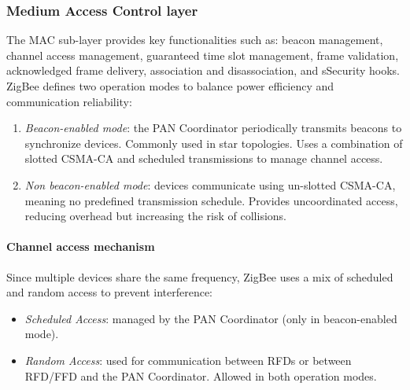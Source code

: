\subsubsection{Medium Access Control layer}
The MAC sub-layer provides key functionalities such as: beacon management, channel access management, guaranteed time slot management, frame validation, acknowledged frame delivery, association and disassociation, and sSecurity hooks.
ZigBee defines two operation modes to balance power efficiency and communication reliability:
\begin{enumerate}
    \item \textit{Beacon-enabled mode}: the PAN Coordinator periodically transmits beacons to synchronize devices.
        Commonly used in star topologies.
        Uses a combination of slotted CSMA-CA and scheduled transmissions to manage channel access.
    \item \textit{Non beacon-enabled mode}: devices communicate using un-slotted CSMA-CA, meaning no predefined transmission schedule.
        Provides uncoordinated access, reducing overhead but increasing the risk of collisions.
\end{enumerate}

\paragraph*{Channel access mechanism}
Since multiple devices share the same frequency, ZigBee uses a mix of scheduled and random access to prevent interference:
\begin{itemize}
    \item \textit{Scheduled Access}: managed by the PAN Coordinator (only in beacon-enabled mode).
    \item \textit{Random Access}: used for communication between RFDs or between RFD/FFD and the PAN Coordinator.
        Allowed in both operation modes.
\end{itemize}

